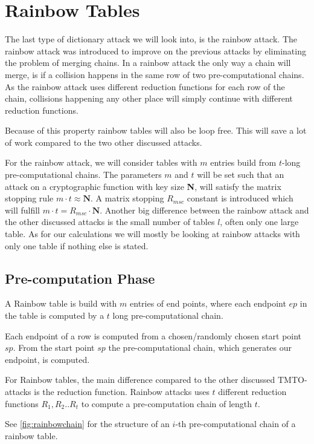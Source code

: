 \section{Rainbow Tables}
\label{sec:raintheory}

The last type of dictionary attack we will look into, is the rainbow
attack. The rainbow attack was introduced to improve on the previous
attacks by eliminating the problem of merging chains. In a rainbow
attack the only way a chain will merge, is if a collision happens in
the same row of two pre-computational chains. As the rainbow attack uses different
reduction functions for each row of the chain, collisions happening
any other place will simply continue with different reduction
functions.

Because of this property rainbow tables will also be loop free. This
will save a lot of work compared to the two other discussed attacks.

For the rainbow attack, we will consider tables with $m$ entries build
from $t$-long pre-computational chains. The parameters $m$ and $t$
will be set such that an attack on a cryptographic
function with key size \textbf{N}, will satisfy the matrix
stopping rule $m \cdot t \approx \textbf{N}$. A matrix stopping $R_{msc}$
constant is introduced which will fulfill $m\cdot t = R_{msc} \cdot
\textbf{N}$. Another big difference between the rainbow attack and the
other discussed attacks is the small number of tables $l$, often only
one large table. As for our calculations we will mostly be looking at
rainbow attacks with only one table if nothing else is stated.

\subsection{Pre-computation Phase}

A Rainbow table is build with $m$ entries of end points, where each endpoint
$ep$ in the table is computed by a $t$ long pre-computational chain.

Each endpoint of a row is computed from a chosen/randomly chosen
start point $sp$. From the start point $sp$ the pre-computational chain,
which generates our endpoint, is computed.

For Rainbow tables, the main difference compared to the other
discussed TMTO-attacks is the reduction function. Rainbow attacks
uses $t$ different reduction functions $R_1,R_2..R_t$ to compute a pre-computation
chain of length $t$.

See \ref{fig:rainbowchain} for the structure of an $i$-th
pre-computational chain of a rainbow table.

